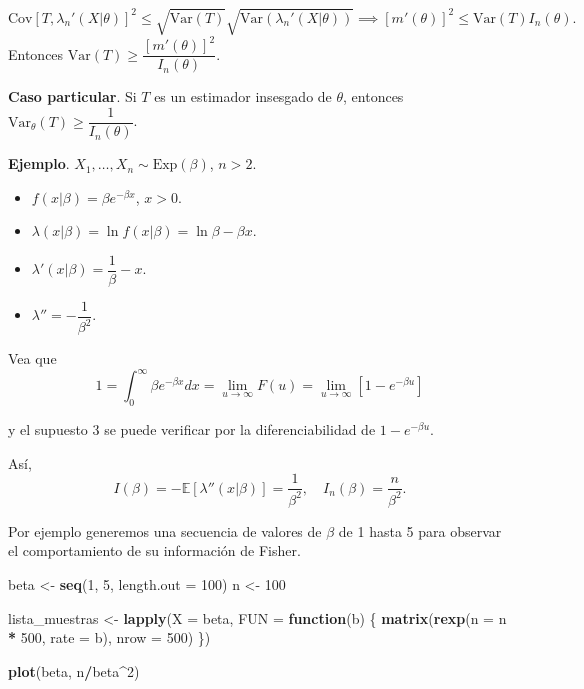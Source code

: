 \documentclass[
  12pt,
]{book}
\newenvironment{Shaded}{\begin{snugshade}}{\end{snugshade}}
\newcommand{\ControlFlowTok}[1]{\textcolor[rgb]{0.13,0.29,0.53}{\textbf{#1}}}
\newcommand{\DataTypeTok}[1]{\textcolor[rgb]{0.13,0.29,0.53}{#1}}
\newcommand{\DecValTok}[1]{\textcolor[rgb]{0.00,0.00,0.81}{#1}}
\newcommand{\KeywordTok}[1]{\textcolor[rgb]{0.13,0.29,0.53}{\textbf{#1}}}
\newcommand{\NormalTok}[1]{#1}
\newcommand{\OperatorTok}[1]{\textcolor[rgb]{0.81,0.36,0.00}{\textbf{#1}}}
\newcommand{\StringTok}[1]{\textcolor[rgb]{0.31,0.60,0.02}{#1}}
\begin{document}
\[\text{Cov}[T,\lambda_n'(X|\theta)]^2 \leq \sqrt{\text{Var}(T)}\sqrt{\text{Var}(\lambda_n'(X|\theta))} \implies [m'(\theta)]^2 \leq \text{Var}(T) I_n(\theta). \]
Entonces \(\text{Var}(T)\geq \dfrac{[m'(\theta)]^2 }{I_n(\theta)}\).

\textbf{Caso particular}. Si \(T\) es un estimador insesgado de \(\theta\), entonces \(\text{Var}_\theta(T)\geq \dfrac{1 }{I_n(\theta)}\).

\textbf{Ejemplo}. \(X_1,\dots, X_n \sim \text{Exp}(\beta)\), \(n>2\).

\begin{itemize}
\item
  \(f(x|\beta) = \beta e^{-\beta x}\), \(x>0\).
\item
  \(\lambda(x|\beta) = \ln f(x|\beta) = \ln \beta -\beta x\).
\item
  \(\lambda'(x|\beta) = \dfrac 1\beta -x.\)
\item
  \(\lambda'' = -\dfrac 1{\beta^2}\).
\end{itemize}

Vea que
\[1 = \int_{0}^\infty \beta e^{-\beta x}dx = \lim_{u\to \infty}F(u) = \lim_{u\to \infty}[1-e^{-\beta u}]\]

y el supuesto 3 se puede verificar por la diferenciabilidad de \(1-e^{-\beta u}\).

Así,
\[I(\beta) = -\mathbb E[\lambda''(x|\beta)] = \dfrac 1{\beta^2}, \quad I_n(\beta) = \dfrac{n}{\beta^2}.\]

Por ejemplo generemos una secuencia de valores de \(\beta\) de 1 hasta 5 para
observar el comportamiento de su información de Fisher.

\begin{Shaded}
\begin{Highlighting}[]
\NormalTok{beta \textless{}{-}}\StringTok{ }\KeywordTok{seq}\NormalTok{(}\DecValTok{1}\NormalTok{, }\DecValTok{5}\NormalTok{, }\DataTypeTok{length.out =} \DecValTok{100}\NormalTok{)}
\NormalTok{n \textless{}{-}}\StringTok{ }\DecValTok{100}

\NormalTok{lista\_muestras \textless{}{-}}\StringTok{ }\KeywordTok{lapply}\NormalTok{(}\DataTypeTok{X =}\NormalTok{ beta, }\DataTypeTok{FUN =} \ControlFlowTok{function}\NormalTok{(b) \{}
    \KeywordTok{matrix}\NormalTok{(}\KeywordTok{rexp}\NormalTok{(}\DataTypeTok{n =}\NormalTok{ n }\OperatorTok{*}\StringTok{ }\DecValTok{500}\NormalTok{, }\DataTypeTok{rate =}\NormalTok{ b), }\DataTypeTok{nrow =} \DecValTok{500}\NormalTok{)}
\NormalTok{\})}

\KeywordTok{plot}\NormalTok{(beta, n}\OperatorTok{/}\NormalTok{beta}\OperatorTok{\^{}}\DecValTok{2}\NormalTok{)}
\end{Highlighting}
\end{Shaded}
\end{document}
